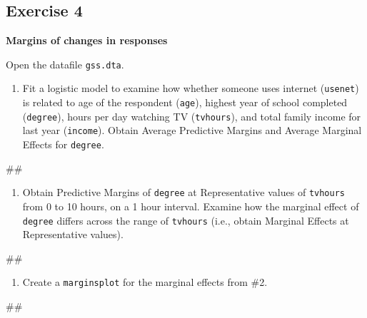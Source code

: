 \documentclass[
]{book}
\newenvironment{Shaded}{\begin{snugshade}}{\end{snugshade}}
\newcommand{\NormalTok}[1]{#1}
\providecommand{\tightlist}{%
  \setlength{\itemsep}{0pt}\setlength{\parskip}{0pt}}
\begin{document}
\hypertarget{exercise-4-2}{%
\subsection{Exercise 4}\label{exercise-4-2}}

\textbf{Margins of changes in responses}

Open the datafile \texttt{gss.dta}.

\begin{enumerate}
\def\labelenumi{\arabic{enumi}.}
\tightlist
\item
  Fit a logistic model to examine how whether someone uses internet (\texttt{usenet}) is related to age of the respondent (\texttt{age}), highest year of school completed (\texttt{degree}), hours per day watching TV (\texttt{tvhours}), and total family income for last year (\texttt{income}). Obtain Average Predictive Margins and Average Marginal Effects for \texttt{degree}.
\end{enumerate}

\begin{Shaded}
\begin{Highlighting}[]
\NormalTok{\#\# }
\end{Highlighting}
\end{Shaded}

\begin{enumerate}
\def\labelenumi{\arabic{enumi}.}
\setcounter{enumi}{1}
\tightlist
\item
  Obtain Predictive Margins of \texttt{degree} at Representative values of \texttt{tvhours} from 0 to 10 hours, on a 1 hour interval. Examine how the marginal effect of \texttt{degree} differs across the range of \texttt{tvhours} (i.e., obtain Marginal Effects at Representative values).
\end{enumerate}

\begin{Shaded}
\begin{Highlighting}[]
\NormalTok{\#\#}
\end{Highlighting}
\end{Shaded}

\begin{enumerate}
\def\labelenumi{\arabic{enumi}.}
\setcounter{enumi}{2}
\tightlist
\item
  Create a \texttt{marginsplot} for the marginal effects from \#2.
\end{enumerate}

\begin{Shaded}
\begin{Highlighting}[]
\NormalTok{\#\#}
\end{Highlighting}
\end{Shaded}
\end{document}
